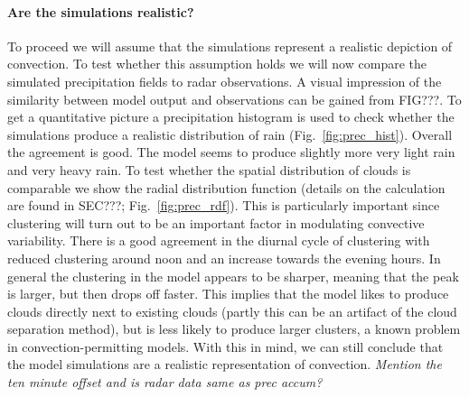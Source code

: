 \documentclass[a4paper, 12pt]{article}
\begin{document}
\paragraph{Are the simulations realistic?} To proceed we will assume that the simulations represent a realistic depiction of convection. To test whether this assumption holds we will now compare the simulated precipitation fields to radar observations. A visual impression of the similarity between model output and observations can be gained from FIG???. To get a quantitative picture a precipitation histogram is used to check whether the simulations produce a realistic distribution of rain (Fig.~\ref{fig:prec_hist}). Overall the agreement is good. The model seems to produce slightly more very light rain and very heavy rain. To test whether the spatial distribution of clouds is comparable we show the radial distribution function (details on the calculation are found in SEC???; Fig.~\ref{fig:prec_rdf}). This is particularly important since clustering will turn out to be an important factor in modulating convective variability. There is a good agreement in the diurnal cycle of clustering with reduced clustering around noon and an increase towards the evening hours. In general the clustering in the model appears to be sharper, meaning that the peak is larger, but then drops off faster. This implies that the model likes to produce clouds directly next to existing clouds (partly this can be an artifact of the cloud separation method), but is less likely to produce larger clusters, a known problem in convection-permitting models. With this in mind, we can still conclude that the model simulations are a realistic representation of convection.  \textit{Mention the ten minute offset and is radar data same as prec accum?}
\end{document}
